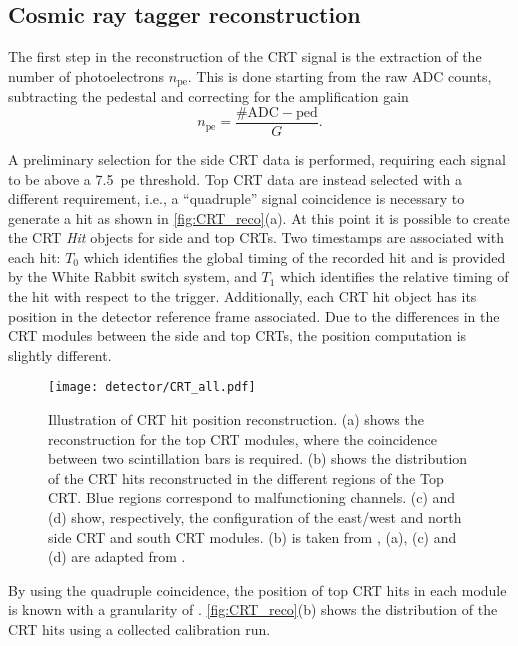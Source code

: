 \subsection{Cosmic ray tagger reconstruction} 

The first step in the reconstruction of the CRT signal is the extraction of the number of photoelectrons $n_\mathrm{pe}$. This is done starting from the raw ADC counts, subtracting the pedestal and correcting for the amplification gain \begin{equation}
    n_\mathrm{pe} = \frac{\mathrm{\#ADC} - \mathrm{ped}}{G}. 
\end{equation} 

A preliminary selection for the side CRT data is performed, requiring each signal to be above a \SI{7.5}{pe} threshold. Top CRT data are instead selected with a different requirement, i.e., a ``quadruple'' signal coincidence is necessary to generate a hit as shown in \autoref{fig:CRT_reco}(a). At this point it is possible to create the CRT \emph{Hit} objects for side and top CRTs. Two timestamps are associated with each hit: $T_0$ which identifies the global timing of the recorded hit and is provided by the White Rabbit switch system, and $T_1$ which identifies the relative timing of the hit with respect to the trigger. Additionally, each CRT hit object has its position in the detector reference frame associated. Due to the differences in the CRT modules between the side and top CRTs, the position computation is slightly different. 

\begin{figure}
    \centering
    \texttt{[image: detector/CRT\_all.pdf]}
    \caption[CRT Hit reconstruction in space]{Illustration of CRT hit position reconstruction. (a) shows the reconstruction for the top CRT modules, where the coincidence between two scintillation bars is required. (b) shows the distribution of the CRT hits reconstructed in the different regions of the Top CRT. Blue regions correspond to malfunctioning channels. (c) and (d) show, respectively, the configuration of the east/west and north side CRT and south CRT modules. (b) is taken from \cite{Poppi:2023zmp}, (a), (c) and (d) are adapted from \cite{arteroponsStudyReconstructionNuMuCC}.}
    \label{fig:CRT_reco}
\end{figure}

By using the quadruple coincidence, the position of top CRT hits in each module is known with a granularity of . \autoref{fig:CRT_reco}(b) shows the distribution of the CRT hits using a collected calibration run. 

